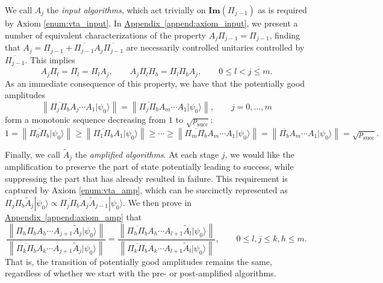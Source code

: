 \documentclass[letterpaper,onecolumn,11pt,accepted=2026-02-14]{quantumarticle}
\newcommand{\norm}[1]{\left\lVert#1\right\rVert}
\theoremstyle{remark}
\theoremstyle{plain}
\newcommand{\append}[1]{\hyperref[append:#1]{Appendix~\ref*{append:#1}}}
\newcommand{\ket}[1]{|#1\rangle}
\begin{document}
We call $A_j$ the \emph{input algorithms}, which act trivially on $\mathbf{Im}(\Pi_{j-1})$ as is required by Axiom \ref{enum:vta_input}. In \append{axiom_input}, we present a number of equivalent characterizations of the property $A_j\Pi_{j-1}=\Pi_{j-1}$, finding that $A_j=\Pi_{j-1}+\overline{\Pi_{j-1}}A_j\overline{\Pi_{j-1}}$ are necessarily controlled unitaries controlled by $\overline{\Pi_{j-1}}$. This implies
\begin{equation}
    A_j\Pi_l=\Pi_l=\Pi_lA_j,\qquad A_j\overline{\Pi_l\Pi_b}=\overline{\Pi_l\Pi_b}A_j,\qquad
    0\leq l<j\leq m.
\end{equation}
As an immediate consequence of this property, we have that the potentially good amplitudes
\begin{equation}
\label{eq:pg_amp}
    \norm{\overline{\Pi_{j}\Pi_b}A_{j}\cdots A_1\ket{\psi_0}}=\norm{\overline{\Pi_{j}\Pi_b}A_{m}\cdots A_1\ket{\psi_0}},\qquad
    j=0,\ldots,m
\end{equation}
form a monotonic sequence decreasing from $1$ to $\sqrt{p_{\text{succ}}}$:
\begin{equation}
    1=\norm{\overline{\Pi_{0}\Pi_b}\ket{\psi_0}}\geq\norm{\overline{\Pi_{1}\Pi_b}A_1\ket{\psi_0}}\geq\cdots\geq\norm{\overline{\Pi_{m}\Pi_b}A_{m}\cdots A_1\ket{\psi_0}}=\norm{\overline{\Pi_b}A_{m}\cdots A_1\ket{\psi_0}}=\sqrt{p_{\text{succ}}}.
\end{equation}

Finally, we call $\widetilde A_j$ the \emph{amplified algorithms}. At each stage $j$, we would like the amplification to preserve the part of state potentially leading to success, while suppressing the part that has already resulted in failure. This requirement is captured by Axiom \ref{enum:vta_amp}, which can be succinctly represented as $\overline{\Pi_j\Pi_b}\widetilde{A}_j\ket{\psi_0}\propto\overline{\Pi_j\Pi_b}A_j\widetilde{A}_{j-1}\ket{\psi_0}$. We then prove in \append{axiom_amp} that
\begin{equation}
\label{eq:trans_amp}
    \frac{\norm{\overline{\Pi_{h}\Pi_b}A_{h}\cdots A_{j+1}\widetilde{A}_{j}\ket{\psi_0}}}{\norm{\overline{\Pi_{k}\Pi_b}A_{k}\cdots A_{j+1}\widetilde{A}_{j}\ket{\psi_0}}}
    =\frac{\norm{\overline{\Pi_{h}\Pi_b}A_{h}\cdots A_{l+1}\widetilde{A}_{l}\ket{\psi_0}}}{\norm{\overline{\Pi_{k}\Pi_b}A_{k}\cdots A_{l+1}\widetilde{A}_{l}\ket{\psi_0}}},\qquad
    0\leq l,j\leq k,h\leq m.
\end{equation}
That is, the transition of potentially good amplitudes remains the same, regardless of whether we start with the pre- or post-amplified algorithms.
\end{document}
